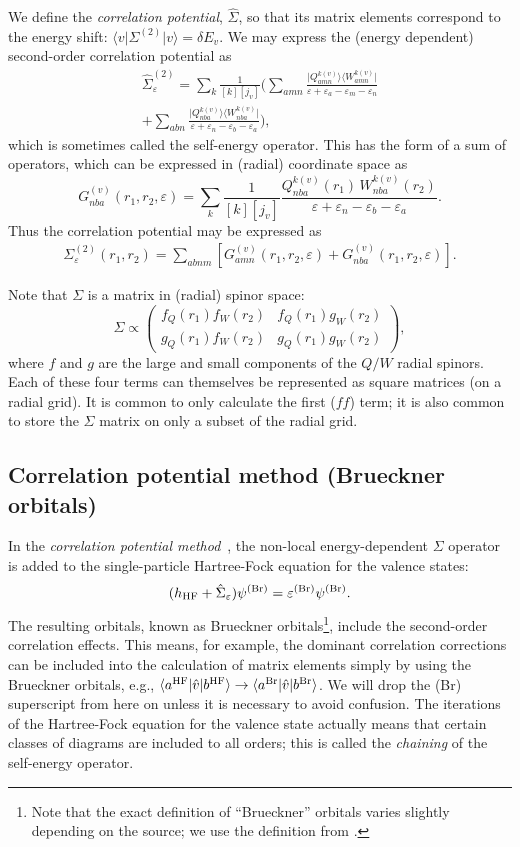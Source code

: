 \documentclass[10pt,twocolumn,a4paper]{article}%
\newcommand{\bra}[1]{\ensuremath{\langle #1|}}	%
\newcommand{\ket}[1]{\ensuremath{|#1\rangle}}
\newcommand{\matr}[4]{\ensuremath{\begin{pmatrix}#1&#2\\#3&#4\end{pmatrix}}}	%
\newcommand{\be}{\begin{equation}}
\newcommand{\ee}{\end{equation}}
\def\en{\ensuremath{\varepsilon}}
\begin{document}
We define the {\em correlation potential}, $\hat \Sigma$, so that its matrix elements correspond to the energy shift: $\bra{v}\Sigma^{(2)}\ket{v} = \delta E_v$.
We may express the (energy dependent) second-order correlation potential as
\begin{multline}
\hat \Sigma^{(2)}_{\en} = 
\sum_{k}\frac{1}{[k][j_v]}\Big(
\sum_{amn}\frac{\ket{Q^{k(v)}_{amn}}\bra{W^{k(v)}_{amn}}}
{\en + \en_a-\en_m-\en_n}\\
+
\sum_{abn}\frac{\ket{Q^{k(v)}_{nba}}\bra{W^{k(v)}_{nba}}}
{\en + \en_n-\en_b-\en_a}
\Big),
\end{multline}
which is sometimes called the self-energy operator.
This has the form of a sum of operators,
which can be expressed in (radial) coordinate space as
\be
G^{(v)}_{nba}(r_1,r_2,\en) = \sum_{k}\frac{1}{[k][j_v]}
\frac{Q^{k(v)}_{nba}(r_1)\, W^{k(v)}_{nba}(r_2)}
{\en + \en_n-\en_b-\en_a}.
\ee
Thus the correlation potential may be expressed as
\begin{multline}
\Sigma^{(2)}_{\en}(r_1,r_2) = 
\sum_{abnm}\left[
G^{(v)}_{amn}(r_1,r_2,\en)
+
G^{(v)}_{nba}(r_1,r_2,\en)
\right].
\end{multline}

Note that $\Sigma$ is a matrix in (radial) spinor space:
\be
\Sigma \propto \matr{f_Q(r_1)f_W(r_2)}{f_Q(r_1)g_W(r_2)}{g_Q(r_1)f_W(r_2)}{g_Q(r_1)g_W(r_2)},
\ee
where $f$ and $g$ are the large and small components of the $Q/W$ radial spinors.
Each of these four terms can themselves be represented as square matrices (on a radial grid).
It is common to only calculate the first ($ff$) term; it is also common to store the $\Sigma$ matrix on only a subset of the radial grid.

\subsection{Correlation potential method (Brueckner orbitals)}



In the {\em correlation potential method}~\cite{DzubaPNC1984,DzubaPNC1985}, the non-local energy-dependent $\Sigma$ operator is added to the single-particle Hartree-Fock equation for the valence states:
\be\label{eq:H-Bru}
(h_{\rm HF} + \hat \Sigma_\en)\psi^{\rm (Br)} = \en^{\rm (Br)}\psi^{\rm (Br)}.
\ee
The resulting orbitals, known as Brueckner orbitals\footnote{Note that the exact definition of ``Brueckner'' orbitals varies slightly depending on the source; we use the definition from \cite{DzubaPNC1984}.}, include the second-order correlation effects.
This means, for example, the dominant correlation corrections can be included into the calculation of matrix elements simply by using the Brueckner orbitals, e.g., $\bra{a^{\rm HF}}{\hat v}\ket{b^{\rm HF}}\to\bra{a^{\rm Br}}{\hat v}\ket{b^{\rm Br}}$.
We will drop the (Br) superscript from here on unless it is necessary to avoid confusion.
The iterations of the Hartree-Fock equation for the valence state actually means that certain classes of diagrams are included to all orders; this is called the {\em chaining} of the self-energy operator.
\end{document}
